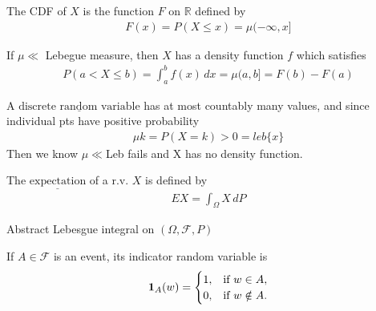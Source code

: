 \documentclass[11pt]{article}
\begin{document}
\begin{definition}
    The CDF of $X$ is the function $F$ on $\mathbb{R}$ defined by 
    \begin{align*}
        F(x) = P(X \le x) = \mu(-\infty,x]
    \end{align*}
\end{definition}
\begin{definition}
    If $\mu \ll $ Lebegue measure, then $X$ has a density function $f$ which satisfies 
    \begin{align*}
        P(a < X \le b) = \int _{a}^{b} f(x) \, dx = \mu(a,b] = F(b) - F(a)
    \end{align*}
\end{definition}

\begin{remark}
    A $\underline{\text{discrete random variable}}$ has at most countably many values, and since individual pts have
    positive probability
    \begin{align*}
        \mu {k} = P(X=k) > 0 = leb\{x\}
    \end{align*}
    Then we know $\mu \ll $Leb fails and X has no density function.
\end{remark}


\begin{definition}
    The $\underline{\text{expectation}}$ of a r.v. $X$ is defined by 
    \begin{align*}
        EX = \int_{\Omega} X \, dP
    \end{align*}
    \begin{remark}
        Abstract Lebesgue integral on $(\Omega, \mathcal{F}, P)$
    \end{remark}
\end{definition}

\begin{definition}
    If $A \in \mathcal{F}$ is an event, its indicator random variable is 
    \[
    \bm{1} _{A}(w) = 
    \begin{cases} 
        1, & \text{if } w \in A, \\
        0, & \text{if } w \notin A.
    \end{cases}
    \]
\end{definition}
\end{document}
